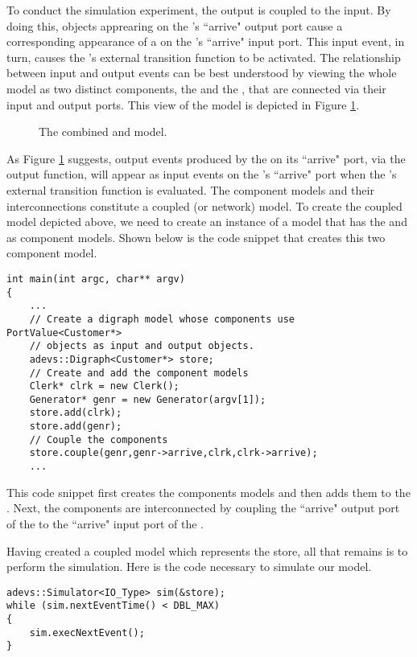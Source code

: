 To conduct the simulation experiment, the  output is coupled to the  input.  By doing this,
 objects apprearing on the 's 
``arrive" output port cause a
corresponding appearance of a  on the 's ``arrive" input port.
This input event, in turn, causes the 's external
transition function to be activated. The relationship between input
and output events can be best understood by viewing the whole model as two
distinct components, the  and the , that are connected
via their input and output ports. This view of the model is depicted
in Figure \ref{fig:clerk_and_generator}.
\begin{figure}[ht]
\centering
{}
\caption{The combined  and  model.}
\label{fig:clerk_and_generator}
\end{figure}

As Figure \ref{fig:clerk_and_generator} suggests, output events produced by the  on its ``arrive" port, via the output function, will appear
as input events on the 's ``arrive" port when the 's
external transition function is evaluated. The component models and
their interconnections constitute a coupled (or network) model. To
create the coupled model depicted above, we need to create an
instance of a  model that has the  and  as
component models. Shown below is the code snippet that creates this two component model.
\begin{verbatim}
int main(int argc, char** argv)
{
    ...
    // Create a digraph model whose components use PortValue<Customer*>
    // objects as input and output objects.
    adevs::Digraph<Customer*> store;
    // Create and add the component models
    Clerk* clrk = new Clerk();
    Generator* genr = new Generator(argv[1]); 
    store.add(clrk);
    store.add(genr);
    // Couple the components
    store.couple(genr,genr->arrive,clrk,clrk->arrive);
    ...
\end{verbatim}
This code snippet first creates the components models and then adds them to
the .
Next, the components are
interconnected by coupling the ``arrive" output port of
the  to the ``arrive" input port of the
.

Having created a coupled model which represents the
store, all that remains is to perform the simulation. Here is the
code necessary to simulate our model.
\begin{verbatim}
adevs::Simulator<IO_Type> sim(&store);
while (sim.nextEventTime() < DBL_MAX)
{
    sim.execNextEvent();
}
\end{verbatim}

